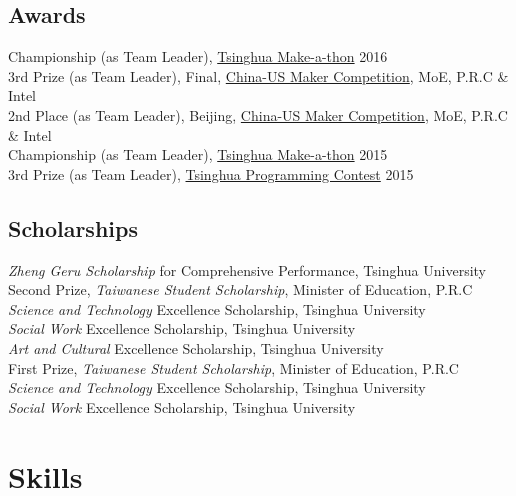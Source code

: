 \documentclass[11pt, a4paper]{article} %
\newcommand{\years}[1]{\marginnote{\scriptsize #1}} %
\begin{document}
\subsection*{Awards}
\years{2016}
Championship (as Team Leader), \href{http://thumaker.cn/blog/2017%E5%88%9B%E5%AE%A2%E6%8C%91%E6%88%98%E8%B5%9B-%E6%8A%A5%E5%90%8D%E4%BB%85%E6%AD%A4%E4%B8%80%E5%91%A8/}{Tsinghua Make-a-thon} 2016\\
\years{2015}
3rd Prize (as Team Leader), Final, \href{https://www.chinaus-maker.org/}{China-US Maker Competition}, MoE, P.R.C \& Intel\\
2nd Place (as Team Leader), Beijing, \href{https://www.chinaus-maker.org/}{China-US Maker Competition}, MoE, P.R.C \& Intel\\
Championship (as Team Leader), \href{http://thumaker.cn/blog/2017%E5%88%9B%E5%AE%A2%E6%8C%91%E6%88%98%E8%B5%9B-%E6%8A%A5%E5%90%8D%E4%BB%85%E6%AD%A4%E4%B8%80%E5%91%A8/}{Tsinghua Make-a-thon} 2015\\
3rd Prize (as Team Leader), \href{https://cpclash.eesast.com/}{Tsinghua Programming Contest} 2015
\subsection*{Scholarships}
\years{2016}
\emph{Zheng Geru Scholarship} for Comprehensive Performance, Tsinghua University\\
Second Prize, \emph{Taiwanese Student Scholarship}, Minister of Education, P.R.C\\
\emph{Science and Technology} Excellence Scholarship, Tsinghua University\\
\emph{Social Work} Excellence Scholarship, Tsinghua University\\
\emph{Art and Cultural} Excellence Scholarship, Tsinghua University\\
\years{2015} 
First Prize, \emph{Taiwanese Student Scholarship}, Minister of Education, P.R.C\\
\emph{Science and Technology} Excellence Scholarship, Tsinghua University\\
\emph{Social Work} Excellence Scholarship, Tsinghua University






\section*{Skills}
\end{document}
